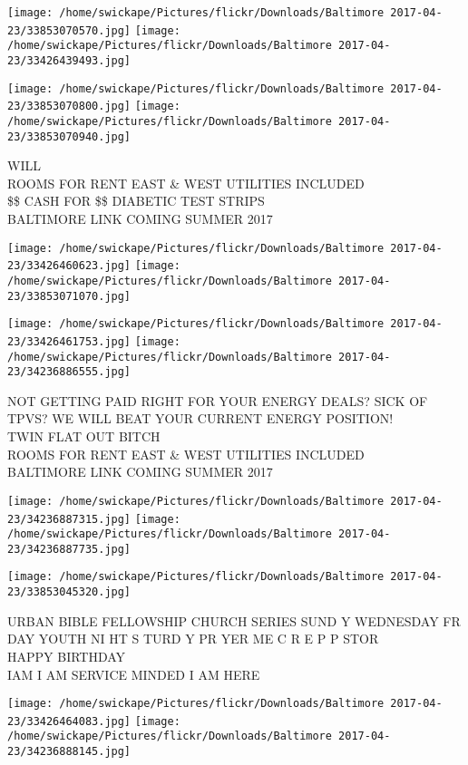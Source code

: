 \documentclass[10pt,letterpaper]{article}
\begin{document}
\texttt{[image: /home/swickape/Pictures/flickr/Downloads/Baltimore 2017-04-23/33853070570.jpg]}
\texttt{[image: /home/swickape/Pictures/flickr/Downloads/Baltimore 2017-04-23/33426439493.jpg]}

\texttt{[image: /home/swickape/Pictures/flickr/Downloads/Baltimore 2017-04-23/33853070800.jpg]}
\texttt{[image: /home/swickape/Pictures/flickr/Downloads/Baltimore 2017-04-23/33853070940.jpg]}

WILL\\
ROOMS FOR RENT EAST \& WEST UTILITIES INCLUDED\\
\$\$ CASH FOR \$\$ DIABETIC TEST STRIPS\\
BALTIMORE LINK COMING SUMMER 2017
\pagebreak

\texttt{[image: /home/swickape/Pictures/flickr/Downloads/Baltimore 2017-04-23/33426460623.jpg]}
\texttt{[image: /home/swickape/Pictures/flickr/Downloads/Baltimore 2017-04-23/33853071070.jpg]}

\texttt{[image: /home/swickape/Pictures/flickr/Downloads/Baltimore 2017-04-23/33426461753.jpg]}
\texttt{[image: /home/swickape/Pictures/flickr/Downloads/Baltimore 2017-04-23/34236886555.jpg]}

NOT GETTING PAID RIGHT FOR YOUR ENERGY DEALS?  SICK OF TPVS?  WE WILL BEAT YOUR CURRENT ENERGY POSITION!\\
TWIN FLAT OUT BITCH\\
ROOMS FOR RENT EAST \& WEST UTILITIES INCLUDED\\
BALTIMORE LINK COMING SUMMER 2017
\pagebreak

\texttt{[image: /home/swickape/Pictures/flickr/Downloads/Baltimore 2017-04-23/34236887315.jpg]}
\texttt{[image: /home/swickape/Pictures/flickr/Downloads/Baltimore 2017-04-23/34236887735.jpg]}

\vspace{0.25in}
\texttt{[image: /home/swickape/Pictures/flickr/Downloads/Baltimore 2017-04-23/33853045320.jpg]}

URBAN BIBLE FELLOWSHIP CHURCH SERIES SUND Y WEDNESDAY FR DAY YOUTH NI HT S TURD Y PR YER ME C R E P P STOR\\
HAPPY BIRTHDAY\\
IAM I AM SERVICE MINDED I AM HERE
\pagebreak

\texttt{[image: /home/swickape/Pictures/flickr/Downloads/Baltimore 2017-04-23/33426464083.jpg]}
\texttt{[image: /home/swickape/Pictures/flickr/Downloads/Baltimore 2017-04-23/34236888145.jpg]}
\end{document}
